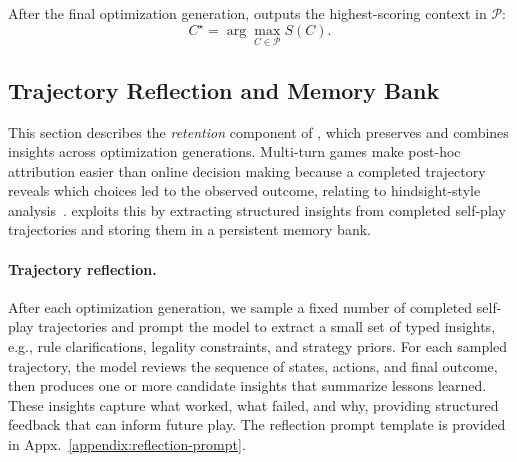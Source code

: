 After the final optimization generation, \NAME{} outputs the highest-scoring context in \(\mathcal{P}\): \[ C^\star = \arg\max_{C\in\mathcal{P}} S(C). \]





\subsection{Trajectory Reflection and Memory Bank}
\label{sec:memory}

This section describes the \emph{retention} component of \NAME{}, which preserves and combines insights across optimization generations. Multi-turn games make post-hoc attribution easier than online decision making because a completed trajectory reveals which choices led to the observed outcome, relating to hindsight-style analysis~\citep{andrychowicz2017hindsight}. \NAME{} exploits this by extracting structured insights from completed self-play trajectories and storing them in a persistent memory bank.

\paragraph{Trajectory reflection.}
After each optimization generation, we sample a fixed number of completed self-play trajectories and prompt the model to extract a small set of typed insights, e.g., rule clarifications, legality constraints, and strategy priors. 
For each sampled trajectory, the model reviews the sequence of states, actions, and final outcome, then produces one or more candidate insights that summarize lessons learned. 
These insights capture what worked, what failed, and why, providing structured feedback that can inform future play. 
The reflection prompt template is provided in Appx.~\ref{appendix:reflection-prompt}.


